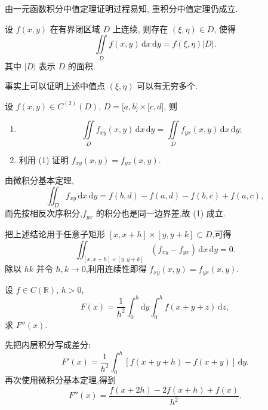 由一元函数积分中值定理证明过程易知, 重积分中值定理仍成立.

\begin{theorem}[\markstar]
    设 $f(x,y)$ 在有界闭区域 $D$ 上连续, 则存在 $(\xi,\eta)\in D$, 使得
    \[
        \displaystyle\iint\limits_Df(x,y)\,\mathrm{d}x\,\mathrm{d}y=f(\xi,\eta)|D|.
    \]
    其中 $|D|$ 表示 $D$ 的面积.
\end{theorem}

\begin{remark}
    事实上可以证明上述中值点 $(\xi,\eta)$ 可以有无穷多个.
\end{remark}

\begin{example}
    设 $f(x,y)\in C^{(2)}(D)$, $D=\lbrack a,b\rbrack\times\lbrack c,d\rbrack$, 则
    \begin{enumerate}
        \item
              \[
                  \displaystyle\iint\limits_D f_{xy}(x,y)\,\mathrm{d}x\,\mathrm{d}y
                  =\iint\limits_D f_{yx}(x,y)\,\mathrm{d}x\,\mathrm{d}y;
              \]
        \item 利用 (1) 证明 $f_{xy}(x,y)=f_{yx}(x,y)$.
    \end{enumerate}
\end{example}
\exampleblank

\begin{solution}
    由微积分基本定理,
    \[
        \displaystyle\iint_Df_{xy}\,\mathrm{d}x\,\mathrm{d}y
        =f(b,d)-f(a,d)-f(b,c)+f(a,c),
    \]
    而先按相反次序积分,$f_{yx}$ 的积分也是同一边界差,故 (1) 成立.

    把上述结论用于任意子矩形 $[x,x+h]\times[y,y+k]\subset D$,可得
    \[
        \displaystyle\iint_{[x,x+h]\times[y,y+k]}(f_{xy}-f_{yx})\,\mathrm{d}x\,\mathrm{d}y=0.
    \]
    除以 $hk$ 并令 $h,k\to0$,利用连续性即得 $f_{xy}(x,y)=f_{yx}(x,y)$.
\end{solution}

\begin{example}
    设 $f\in C(\mathbb{R})$, $h>0$,
    \[
        F(x)=\dfrac{1}{h^2}\int_0^h\mathrm{d}y\int_0^h f(x+y+z)\,\mathrm{d}z,
    \]
    求 $F''(x)$.
\end{example}
\exampleblank

\begin{solution}
    先把内层积分写成差分:
    \[
        F'(x)=\dfrac{1}{h^2}\int_0^h\left[f(x+y+h)-f(x+y)\right]\,\mathrm{d}y.
    \]
    再次使用微积分基本定理,得到
    \[
        F''(x)=\dfrac{f(x+2h)-2f(x+h)+f(x)}{h^2}.
    \]
\end{solution}


